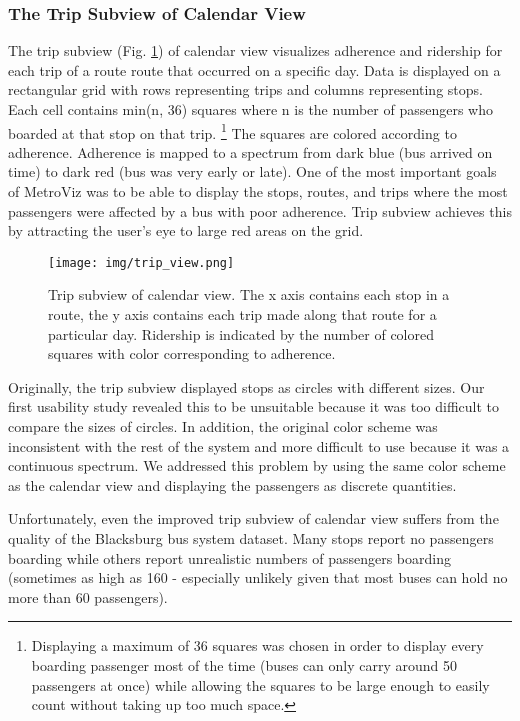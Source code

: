 \documentclass[journal]{vgtc}
\begin{document}
\subsubsection{The Trip Subview of Calendar View}
The trip subview (Fig. \ref{trip_component}) of calendar view visualizes adherence and ridership for each trip of a route route that occurred on a specific day. Data is displayed on a rectangular grid with rows representing trips and columns representing stops. Each cell contains min(n, 36) squares where n is the number of passengers who boarded at that stop on that trip. \footnote{Displaying a maximum of 36 squares was chosen in order to display every boarding passenger most of the time (buses can only carry around 50 passengers at once) while allowing the squares to be large enough to easily count without taking up too much space.} The squares are colored according to adherence. Adherence is mapped to a spectrum from dark blue (bus arrived on time) to dark red (bus was very early or late). One of the most important goals of MetroViz was to be able to display the stops, routes, and trips where the most passengers were affected by a bus with poor adherence. Trip subview achieves this by attracting the user's eye to large red areas on the grid.

\begin{figure}[htb]
 \centering
 \texttt{[image: img/trip\_view.png]}
 \caption{Trip subview of calendar view. The x axis contains each stop in a route, the y axis contains each trip made along that route for a particular day. Ridership is indicated by the number of colored squares with color corresponding to adherence.}
 \label{trip_component}
\end{figure}

Originally, the trip subview displayed stops as circles with different sizes. Our first usability study revealed this to be unsuitable because it was too difficult to compare the sizes of circles. In addition, the original color scheme was inconsistent with the rest of the system and more difficult to use because it was a continuous spectrum. We addressed this problem by using the same color scheme as the calendar view and displaying the passengers as discrete quantities.

Unfortunately, even the improved trip subview of calendar view suffers from the quality of the Blacksburg bus system dataset. Many stops report no passengers boarding while others report unrealistic numbers of passengers boarding (sometimes as high as 160 - especially unlikely given that most buses can hold no more than 60 passengers).
\end{document}

